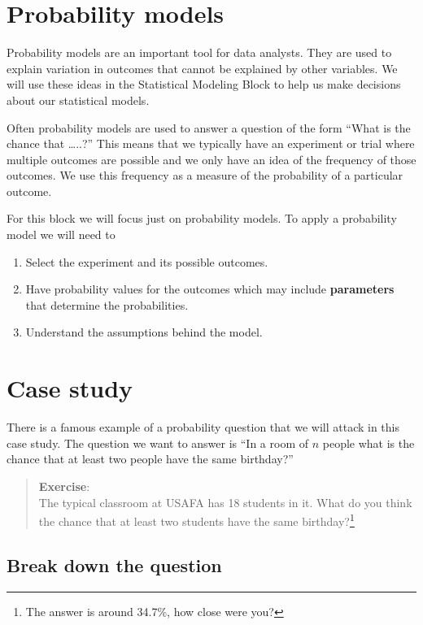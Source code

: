 \documentclass[
  letterpaper,
  DIV=11,
  numbers=noendperiod]{scrreprt}
\providecommand{\tightlist}{%
  \setlength{\itemsep}{0pt}\setlength{\parskip}{0pt}}\usepackage{longtable,booktabs,array}
\begin{document}
\section{Probability models}\label{probability-models}

Probability models are an important tool for data analysts. They are
used to explain variation in outcomes that cannot be explained by other
variables. We will use these ideas in the Statistical Modeling Block to
help us make decisions about our statistical models.

Often probability models are used to answer a question of the form
``What is the chance that \ldots..?'' This means that we typically have
an experiment or trial where multiple outcomes are possible and we only
have an idea of the frequency of those outcomes. We use this frequency
as a measure of the probability of a particular outcome.

For this block we will focus just on probability models. To apply a
probability model we will need to

\begin{enumerate}
\def\labelenumi{\arabic{enumi}.}
\tightlist
\item
  Select the experiment and its possible outcomes.
\item
  Have probability values for the outcomes which may include
  \textbf{parameters} that determine the probabilities.
\item
  Understand the assumptions behind the model.
\end{enumerate}

\section{Case study}\label{case-study-1}

There is a famous example of a probability question that we will attack
in this case study. The question we want to answer is ``In a room of
\(n\) people what is the chance that at least two people have the same
birthday?''

\begin{quote}
\textbf{Exercise}:\\
The typical classroom at USAFA has 18 students in it. What do you think
the chance that at least two students have the same birthday?\footnote{The
  answer is around 34.7\%, how close were you?}
\end{quote}

\subsection{Break down the question}\label{break-down-the-question}
\end{document}
